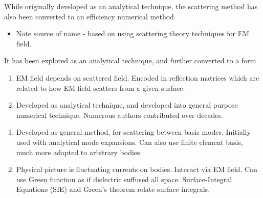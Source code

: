 While originally developed as an analytical technique, 
the scattering method has also been converted to an efficiency numerical method.  

\begin{itemize}
  \item Note source of name - based on using scattering theory techniques for EM field.
\end{itemize}

It has been explored as an analytical technique,
and further converted to a form 
\begin{enumerate}
\item EM field depends on scattered field.  Encoded in reflection matrices
which are related to how EM field scatters from a given surface.  
\item Developed as analytical technique, and developed into general purpose numerical technique.
Numerous authors contributed over decades.
\end{enumerate}

\begin{enumerate}
  \item Developed as general method, for scattering between basis modes.  
    Initially used with analytical mode expansions.  Can also use finite element basis,
    much more adapted to arbitrary bodies.  
\item Physical picture is fluctuating currents on bodies.  Interact via EM field.
  Can use Green function as if dielectric suffused all space.  
Surface-Integral Equations (SIE) and Green's theorem relate surface integrals.  
\end{enumerate}

